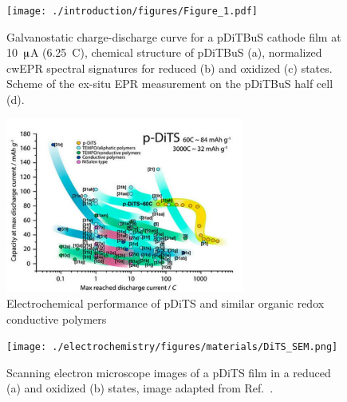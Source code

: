 \begin{figure}
	\texttt{[image: ./introduction/figures/Figure\_1.pdf]}
	\caption{Galvanostatic charge-discharge curve for a pDiTBuS cathode film at 10~$\muup$A (6.25~C), chemical structure of pDiTBuS (a), normalized cwEPR spectral signatures for reduced (b) and oxidized (c) states. Scheme of the ex-situ EPR measurement on the pDiTBuS half cell (d).}
	\label{fig:Figure_1}
\end{figure}


\begin{figure}
	\includegraphics[width=0.7\textwidth]{./electrochemistry/figures/dits_ragone.pdf}
	\caption{Electrochemical performance of pDiTS and similar organic redox conductive polymers~\cite{Vereshchagin2020}}
	\label{fig:dits_ragone}
\end{figure}



\begin{figure}%
	\texttt{[image: ./electrochemistry/figures/materials/DiTS\_SEM.png]}
	\caption{Scanning electron microscope images of a pDiTS film in a reduced (a) and oxidized (b) states, image adapted from Ref.~\cite{Vereshchagin2020}.}
	\label{fig:SEM}
\end{figure}


